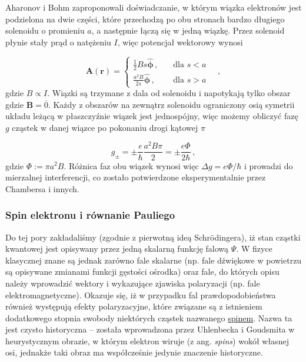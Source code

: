 \documentclass{myclass}
\begin{document}
Aharonov i Bohm zaproponowali doświadczanie, w którym wiązka elektronów jest podzielona na dwie
części, które przechodzą po obu stronach bardzo długiego solenoidu o promieniu \(a\), a następnie
łączą się w jedną wiązkę. Przez solenoid płynie stały prąd o natężeniu \(I\), więc potencjał
wektorowy wynosi

\begin{equation*}
\mathbf{A}(\mathbf{r})=\begin{cases}
\frac{1}{2}Bs\hat{\boldsymbol{\phi}}\,,&\quad\text{dla \(s<a\)}\\
\frac{a^2B}{2s}\hat{\boldsymbol{\phi}}\,,&\quad\text{dla \(s>a\)}
\end{cases}\quad,
\end{equation*}
gdzie \(B\propto I\). Wiązki są trzymane z dala od solenoidu i napotykają tylko obszar gdzie
\(\mathbf{B}=\overline{0}\). Każdy z obszarów na zewnątrz solenoidu ograniczony osią symetrii układu
leżącą w płaszczyźnie wiązek jest jednospójny, więc możemy obliczyć fazę \(g\) cząstek w danej
wiązce po pokonaniu drogi kątowej \(\pi\)

\begin{equation*}
g_{\pm}=\pm\frac{e}{\hbar}\frac{a^2B\pi}{2}=\pm\frac{e\Phi}{2\hbar}\,,
\end{equation*}
gdzie \(\Phi:=\pi a^2B\). Różnica faz obu wiązek wynosi więc \(\Delta g=e\Phi/\hbar\) i prowadzi do
mierzalnej interferencji, co zostało potwierdzone eksperymentalnie przez Chambersa i innych.

\subsubsection{Spin elektronu i równanie Pauliego}

Do tej pory zakładaliśmy (zgodnie z pierwotną ideą Schr{\"o}dingera), iż stan cząstki kwantowej jest
opisywany przez jedną skalarną funkcję falową \(\Psi\). W fizyce klasycznej znane są jednak zarówno
fale skalarne (np. fale dźwiękowe w powietrzu są opisywane zmianami funkcji gęstości ośrodka) oraz
fale, do których opisu należy wprowadzić wektory i wykazujące zjawiska polaryzacji (np. fale
elektromagnetyczne). Okazuje się, iż w przypadku fal prawdopodobieństwa również występują efekty
polaryzacyjne, które związane są z istnieniem dodatkowego stopnia swobody niektórych cząstek
nazwanego \underline{spinem}. Nazwa ta jest czysto historyczna -- została wprowadzona przez
Uhlenbecka i Goudsmita w heurystycznym obrazie, w którym elektron wiruje (z ang. \textit{spins})
wokół własnej osi, jednakże taki obraz ma współcześnie jedynie znaczenie historyczne.\\
\end{document}
